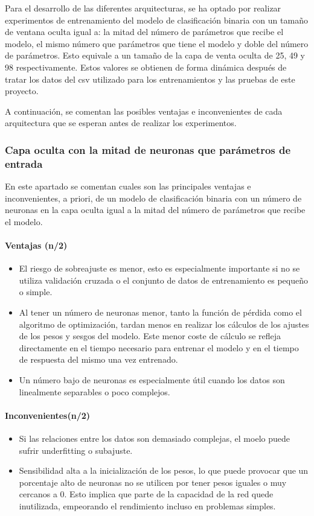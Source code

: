 Para el desarrollo de las diferentes arquitecturas, se ha optado por realizar experimentos de entrenamiento del modelo de clasificación binaria con un tamaño de ventana oculta igual a:
la mitad del número de parámetros que recibe el modelo, el mismo número que parámetros que tiene el modelo y doble del número de parámetros. Esto equivale a un tamaño de la capa de venta oculta de 25, 49 y 98 respectivamente. Estos valores se obtienen de forma dinámica después de tratar los datos del csv  utilizado para los entrenamientos y las pruebas de este proyecto.

A continuación, se comentan las posibles ventajas e inconvenientes de cada arquitectura que se esperan antes de realizar los experimentos.

\subsubsection{Capa oculta con la mitad de neuronas que parámetros de entrada}\label{sec:VIBIN25}
En este apartado se comentan cuales son las principales ventajas e inconvenientes, a priori, de un modelo de clasificación binaria con un número de neuronas en la capa oculta igual a la mitad del número de parámetros que recibe el modelo.

\paragraph{Ventajas (n/2)}
\begin{itemize}
	\item El riesgo de sobreajuste es menor, esto es especialmente importante si no se utiliza validación cruzada o el conjunto de datos de entrenamiento es pequeño o simple.
	\item  Al tener un número de neuronas menor, tanto la función  de pérdida como el algoritmo de optimización, tardan menos en realizar los cálculos de los ajustes de los pesos y sesgos del modelo. Este menor coste de cálculo se refleja directamente en el tiempo necesario para entrenar el modelo y en el tiempo de respuesta del mismo una vez entrenado.
	\item Un número bajo de neuronas es especialmente útil cuando los datos son linealmente separables o poco complejos.
\end{itemize}
\paragraph{Inconvenientes(n/2)}
\begin{itemize}
	\item Si las relaciones entre los datos son demasiado complejas, el moelo puede sufrir underfitting o subajuste.
	\item Sensibilidad alta a la inicialización de los pesos, lo que puede provocar que un porcentaje alto de neuronas no se utilicen por tener pesos iguales o muy cercanos a 0. Esto implica que parte de la capacidad de la red quede inutilizada, empeorando el rendimiento incluso en problemas simples.
\end{itemize}

